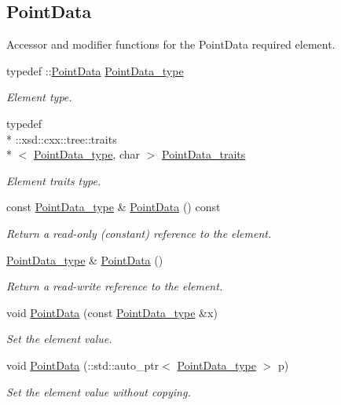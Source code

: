 \subsection*{Point\+Data}
\label{_amgrpe540450fb956cd9dbb96f979e5939d0f}%
Accessor and modifier functions for the Point\+Data required element. \begin{DoxyCompactItemize}
\item 
typedef \+::\hyperlink{classPointData}{Point\+Data} \hyperlink{classPieceUnstructuredGrid__t_a5d79d8ea03ca53f80f24e62c2175ec02}{Point\+Data\+\_\+type}
\begin{DoxyCompactList}\small\item\em Element type. \end{DoxyCompactList}\item 
typedef \\*
\+::xsd\+::cxx\+::tree\+::traits\\*
$<$ \hyperlink{classPieceUnstructuredGrid__t_a5d79d8ea03ca53f80f24e62c2175ec02}{Point\+Data\+\_\+type}, char $>$ \hyperlink{classPieceUnstructuredGrid__t_aee3c7ac7c46c4ebc9f248d31c458d300}{Point\+Data\+\_\+traits}
\begin{DoxyCompactList}\small\item\em Element traits type. \end{DoxyCompactList}\item 
const \hyperlink{classPieceUnstructuredGrid__t_a5d79d8ea03ca53f80f24e62c2175ec02}{Point\+Data\+\_\+type} \& \hyperlink{classPieceUnstructuredGrid__t_a4825627cfe05949b680c81826e9d4ea5}{Point\+Data} () const 
\begin{DoxyCompactList}\small\item\em Return a read-\/only (constant) reference to the element. \end{DoxyCompactList}\item 
\hyperlink{classPieceUnstructuredGrid__t_a5d79d8ea03ca53f80f24e62c2175ec02}{Point\+Data\+\_\+type} \& \hyperlink{classPieceUnstructuredGrid__t_af3a9955626dac2aad17bf879a77d2c0d}{Point\+Data} ()
\begin{DoxyCompactList}\small\item\em Return a read-\/write reference to the element. \end{DoxyCompactList}\item 
void \hyperlink{classPieceUnstructuredGrid__t_aee7745ad1ce39af5fc048e50acb76424}{Point\+Data} (const \hyperlink{classPieceUnstructuredGrid__t_a5d79d8ea03ca53f80f24e62c2175ec02}{Point\+Data\+\_\+type} \&x)
\begin{DoxyCompactList}\small\item\em Set the element value. \end{DoxyCompactList}\item 
void \hyperlink{classPieceUnstructuredGrid__t_a752f5abf0faba70deaab0b4990677612}{Point\+Data} (\+::std\+::auto\+\_\+ptr$<$ \hyperlink{classPieceUnstructuredGrid__t_a5d79d8ea03ca53f80f24e62c2175ec02}{Point\+Data\+\_\+type} $>$ p)
\begin{DoxyCompactList}\small\item\em Set the element value without copying. \end{DoxyCompactList}\end{DoxyCompactItemize}
